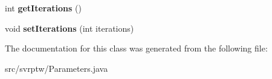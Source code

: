 \begin{DoxyCompactItemize}
\item 
int {\bfseries get\+Iterations} ()\hypertarget{classsvrptw_1_1_parameters_a24b37f5f733897f021be706382df059c}{}\label{classsvrptw_1_1_parameters_a24b37f5f733897f021be706382df059c}

\item 
void {\bfseries set\+Iterations} (int iterations)\hypertarget{classsvrptw_1_1_parameters_a950efc79c346d68a1e13db90b6ae348c}{}\label{classsvrptw_1_1_parameters_a950efc79c346d68a1e13db90b6ae348c}

\end{DoxyCompactItemize}


The documentation for this class was generated from the following file\+:\begin{DoxyCompactItemize}
\item 
src/svrptw/Parameters.\+java\end{DoxyCompactItemize}
